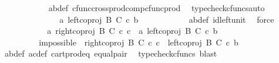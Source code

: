 \begin{isabellebody}
\ \ \ \ \ \ \ \ \ \ \isamarkupfalse%
\ a{\isacharprime}{\kern0pt}b{\isacharprime}{\kern0pt}{\isacharunderscore}{\kern0pt}def\ cfunc{\isacharunderscore}{\kern0pt}cross{\isacharunderscore}{\kern0pt}prod{\isacharunderscore}{\kern0pt}comp{\isacharunderscore}{\kern0pt}cfunc{\isacharunderscore}{\kern0pt}prod\ \isamarkupfalse%
\ {\isacharparenleft}{\kern0pt}typecheck{\isacharunderscore}{\kern0pt}cfuncs{\isacharcomma}{\kern0pt}auto{\isacharparenright}{\kern0pt}\isanewline
\ \ \ \ \ \ \ \ \isamarkupfalse%
\ \isamarkupfalse%
\ {\isachardoublequoteopen}{\isachardot}{\kern0pt}{\isachardot}{\kern0pt}{\isachardot}{\kern0pt}\ {\isacharequal}{\kern0pt}\ \ {\isasymlangle}a{\isacharprime}{\kern0pt}{\isacharcomma}{\kern0pt}\ left{\isacharunderscore}{\kern0pt}coproj\ B\ C\ {\isasymcirc}\isactrlsub c\ b{\isacharprime}{\kern0pt}{\isasymrangle}{\isachardoublequoteclose}\isanewline
\ \ \ \ \ \ \ \ \ \ \isamarkupfalse%
\ a{\isacharprime}{\kern0pt}b{\isacharprime}{\kern0pt}{\isacharunderscore}{\kern0pt}def\ id{\isacharunderscore}{\kern0pt}left{\isacharunderscore}{\kern0pt}unit{}\ \isamarkupfalse%
\ force\isanewline
\ \ \ \ \ \ \ \ \isamarkupfalse%
\ \isamarkupfalse%
\ {\isachardoublequoteopen}{\isasymlangle}a{\isacharcomma}{\kern0pt}\ right{\isacharunderscore}{\kern0pt}coproj\ B\ C\ {\isasymcirc}\isactrlsub c\ c{\isasymrangle}\ {\isacharequal}{\kern0pt}\ {\isasymlangle}a{\isacharprime}{\kern0pt}{\isacharcomma}{\kern0pt}\ left{\isacharunderscore}{\kern0pt}coproj\ B\ C\ {\isasymcirc}\isactrlsub c\ b{\isacharprime}{\kern0pt}{\isasymrangle}{\isachardoublequoteclose}\isacommand{{\isachardot}{\kern0pt}}\isamarkupfalse%
\isanewline
\ \ \ \ \ \ \isamarkupfalse%
\ \ \ \ \ \ \ \ \isanewline
\ \ \ \ \ \ \isamarkupfalse%
\ \isamarkupfalse%
\ impossible{\isacharcolon}{\kern0pt}\ \ {\isachardoublequoteopen}right{\isacharunderscore}{\kern0pt}coproj\ B\ C\ {\isasymcirc}\isactrlsub c\ c\ {\isacharequal}{\kern0pt}\ left{\isacharunderscore}{\kern0pt}coproj\ B\ C\ {\isasymcirc}\isactrlsub c\ b{\isacharprime}{\kern0pt}{\isachardoublequoteclose}\isanewline
\ \ \ \ \ \ \ \ \ \ \isamarkupfalse%
\ a{\isacharprime}{\kern0pt}b{\isacharprime}{\kern0pt}{\isacharunderscore}{\kern0pt}def\ ac{\isacharunderscore}{\kern0pt}def\ cart{\isacharunderscore}{\kern0pt}prod{\isacharunderscore}{\kern0pt}eq{}\ equal{\isacharunderscore}{\kern0pt}pair\ \isamarkupfalse%
\ {\isacharparenleft}{\kern0pt}typecheck{\isacharunderscore}{\kern0pt}cfuncs{\isacharcomma}{\kern0pt}\ blast{\isacharparenright}{\kern0pt}\isanewline

\end{isabellebody}
